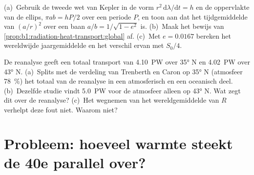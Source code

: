 \begin{exercise}[$\star\star\star$]\label{exo:b1:radiation-heat-transport:11}
(a)~Gebruik de tweede wet van Kepler in de vorm $r^2\,\mathrm d\lambda/\mathrm dt = h$ en de oppervlakte van de ellips, $\pi a b = hP/2$ over een periode $P$, en toon aan dat het tijdgemiddelde van $(a/r)^2$ over een baan $a/b = 1/\sqrt{1 - e^2}$ is. (b)~Maak het bewijs van \cref{prop:b1:radiation-heat-transport:global} af. (c)~Met $e = 0.0167$ bereken het wereldwijde jaargemiddelde en het verschil ervan met $S_0/4$.
\end{exercise}

\begin{exercise}[$\star\star\star$]\label{exo:b1:radiation-heat-transport:12}
De reanalyse geeft een totaal transport van \qty{4.10}{PW} over \ang{35} N en \qty{4.02}{PW} over \ang{43} N. (a)~Splits met de verdeling van Trenberth en Caron op \ang{35} N (atmosfeer \qty{78}{\percent}) het totaal van de reanalyse in een atmosferisch en een oceanisch deel. (b)~Dezelfde studie vindt \qty{5.0}{PW} voor de atmosfeer alleen op \ang{43} N. Wat zegt dit over de reanalyse? (c)~Het wegnemen van het wereldgemiddelde van $R$ verhelpt deze fout niet. Waarom niet?
\end{exercise}

\section{Probleem: hoeveel warmte steekt de 40e parallel over?}

